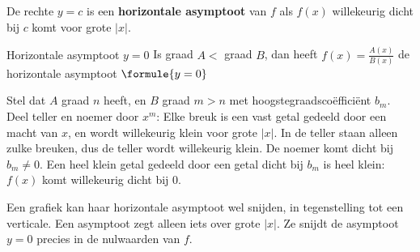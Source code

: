 \begin{theorie}
De rechte $y = c$ is een \textbf{\textcolor{accent}{horizontale asymptoot}} van $f$ als $f(x)$ willekeurig dicht bij $c$ komt voor grote $|x|$.

\begin{stelling}{Horizontale asymptoot $y = 0$}
Is graad $A <$ graad $B$, dan heeft $f(x) = \frac{A(x)}{B(x)}$ de horizontale asymptoot \quad $\formule{y = 0}$
\end{stelling}

\begin{bewijs}
Stel dat $A$ graad $n$ heeft, en $B$ graad $m > n$ met hoogstegraadscoëfficiënt $b_m$. Deel teller en noemer door $x^m$:
Elke breuk is een vast getal gedeeld door een macht van $x$, en wordt willekeurig klein voor grote $|x|$. In de teller staan alleen zulke breuken, dus de teller wordt willekeurig klein. De noemer komt dicht bij $b_m \neq 0$. Een heel klein getal gedeeld door een getal dicht bij $b_m$ is heel klein: $f(x)$ komt willekeurig dicht bij $0$.
\end{bewijs}
\end{theorie}

Een grafiek kan haar horizontale asymptoot wel snijden, in tegenstelling tot een verticale. Een asymptoot zegt alleen iets over grote $|x|$. Ze snijdt de asymptoot $y = 0$ precies in de nulwaarden van $f$.


\begin{oefeningen}
\end{oefeningen}

